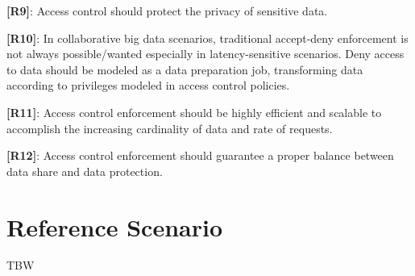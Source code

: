 \noindent  \textbf{[R9]}: Access control should protect the privacy of sensitive data.

\noindent  \textbf{[R10]}: In collaborative big data scenarios, traditional accept-deny enforcement is not always possible/wanted especially in latency-sensitive scenarios. Deny access to data should be modeled as a data preparation job, transforming data according to privileges modeled in access control policies. %

\noindent \textbf{[R11]}: Access control enforcement should be highly efficient and scalable to accomplish the increasing cardinality of data and rate of requests.

\noindent \textbf{[R12]}: Access control enforcement should guarantee a proper balance between data share and data protection.

\section{Reference Scenario}\label{sec:reference}
TBW
